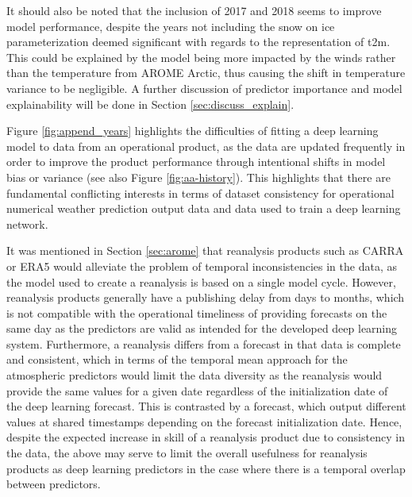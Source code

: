 \documentclass[../main/thesis]{subfiles}
\begin{document}
It should also be noted that the inclusion of 2017 and 2018 seems to improve model performance, despite the years not including the snow on ice parameterization deemed significant with regards to the representation of t2m. This could be explained by the model being more impacted by the winds rather than the temperature from AROME Arctic, thus causing the shift in temperature variance to be negligible. A further discussion of predictor importance and model explainability will be done in Section \ref{sec:discuss_explain}.

Figure \ref{fig:append_years} highlights the difficulties of fitting a deep learning model to data from an operational product, as the data are updated frequently in order to improve the product performance through intentional shifts in model bias or variance \citep{Batrak2019} (see also Figure \ref{fig:aa-history}). This highlights that there are fundamental conflicting interests in terms of dataset consistency for operational numerical weather prediction output data and data used to train a deep learning network.

It was mentioned in Section \ref{sec:arome} that reanalysis products such as CARRA \citep{Koeltzow2022} or ERA5 \citep{Hersbach2020} would alleviate the problem of temporal inconsistencies in the data, as the model used to create a reanalysis is based on a single model cycle. However, reanalysis products generally have a publishing delay from days to months, which is not compatible with the operational timeliness of providing forecasts on the same day as the predictors are valid as  intended for the developed deep learning system. Furthermore, a reanalysis differs from a forecast in that data is complete and consistent, which in terms of the temporal mean approach for the atmospheric predictors would limit the data diversity as the reanalysis would provide the same values for a given date regardless of the initialization date of the deep learning forecast. This is contrasted by a forecast, which output different values at shared timestamps depending on the forecast initialization date. Hence, despite the expected increase in skill of a reanalysis product due to consistency in the data, the above may serve to limit the overall usefulness for reanalysis products as deep learning predictors in the case where there is a temporal overlap between predictors. 
\end{document}
